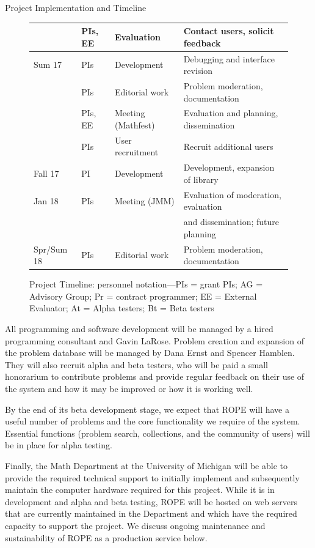 \documentclass[11pt]{article}
\begin{document}
\begin{section}{Project Implementation and Timeline}
\begin{figure}
\begin{center}
\begin{tabular}{|l|l|l|l|}
	    & PIs, EE & Evaluation & Contact users, solicit feedback \\
  \hline
  Sum 17 & PIs & Development & Debugging and interface revision \\
	    & PIs & Editorial work & Problem moderation,
	documentation \\
	    & PIs, EE & Meeting (Mathfest) & Evaluation and planning,
        dissemination \\
	    & PIs & User recruitment & Recruit additional users\\
  \hline
  Fall 17 & PI & Development & Development, expansion of library \\
  \hline
  Jan 18 & PIs & Meeting (JMM) & Evaluation of moderation, evaluation
	\\ & & & and dissemination; future planning \\
  \hline
  Spr/Sum 18 & PIs & Editorial work & Problem moderation,
	documentation \\ 
  \hline
\end{tabular}
\caption{Project Timeline: personnel notation---PIs = grant PIs; AG =
  Advisory Group; Pr = contract programmer; EE = External Evaluator; At =
  Alpha testers; Bt = Beta testers} 
\label{timeline}
\end{center}
\end{figure}

All programming and software development will be managed by a hired
programming consultant and Gavin LaRose.  Problem creation and expansion
of the problem database will be managed by Dana Ernst and Spencer
Hamblen.  They will also recruit alpha and beta testers, who will be paid
a small honorarium to contribute problems and provide regular feedback on
their use of the system and how it may be improved or how it is working
well.

By the end of its beta development stage, we expect that ROPE will have
a useful number of problems and the core functionality we require of the
system.  Essential functions (problem search,
collections, and the community of users) will be in place for alpha
testing.

Finally, the Math Department at the University of Michigan will be able to
provide the required technical support to initially implement and
subsequently maintain the computer hardware required for this project.
While it is in development and alpha and beta testing, ROPE will be
hosted on web servers that are currently maintained in the Department and
which have the required capacity to support the project.  We discuss
ongoing maintenance and sustainability of ROPE as a production service
below. 

\end{section}
\end{document}
